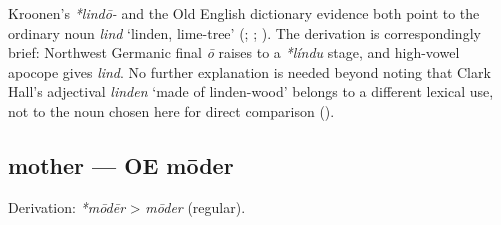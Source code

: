 \documentclass[
  british,
  a4paper,
]{article}
\begin{document}
Kroonen's \emph{*lindō-} and the Old English dictionary evidence both
point to the ordinary noun \emph{lind} `linden, lime-tree'
(;
;
). The
derivation is correspondingly brief: Northwest Germanic final \emph{ō}
raises to a \emph{*líndu} stage, and high-vowel apocope gives
\emph{lind}. No further explanation is needed beyond noting that Clark
Hall's adjectival \emph{linden} `made of linden-wood' belongs to a
different lexical use, not to the noun chosen here for direct comparison
().

\subsection{mother --- OE mōder}\label{mother-oe-mux14dder}

Derivation: \emph{*mōdēr} \textgreater{} \emph{mōder} (regular).

\begingroup
\setlength{\fboxsep}{6pt}
\end{document}
